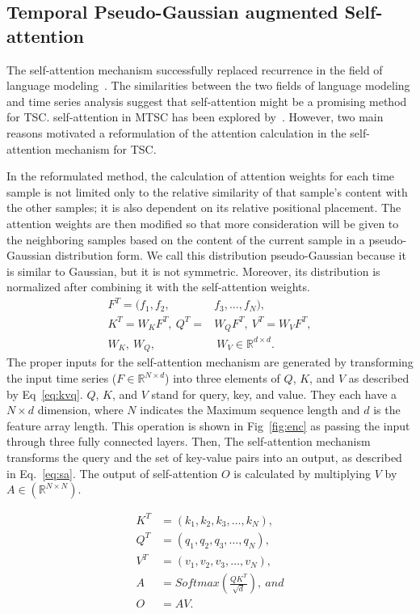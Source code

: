 \documentclass[journal]{IEEEtran}
\begin{document}
\subsection{Temporal Pseudo-Gaussian augmented Self-attention}
The self-attention mechanism successfully replaced recurrence in the field of language modeling~\cite{vaswani2017attention}. The similarities between the two fields of language modeling and time series analysis suggest that self-attention might be a promising method for TSC. self-attention in MTSC has been explored by~\cite{liu2021gated, zerveas2020transformer}. However, two main reasons motivated a reformulation of the attention calculation in the self-attention mechanism for TSC. 

In the reformulated method, the calculation of attention weights for each time sample is not limited only to the relative similarity of that sample's content with the other samples; it is also dependent on its relative positional placement. The attention weights are then modified so that more consideration will be given to the neighboring samples based on the content of the current sample in a pseudo-Gaussian distribution form. We call this distribution pseudo-Gaussian because it is similar to Gaussian, but it is not symmetric. Moreover, its distribution is normalized after combining it with the self-attention weights.
\begin{equation} \label{eq:kvq}
\begin{split}
F^T =(f_1,f_2,& f_3,\ldots,f_N ),\\
K^T= W_K F^T,\: Q^T=& W_Q F^T,\: V^T= W_V F^T,\\
W_K,\ W_Q,&\ W_V \in \mathbb{R}^{d \times d}.
\end{split}
\end{equation}
The proper inputs for the self-attention mechanism are generated by transforming the input time series ($F\in \mathbb{R}^{N \times d}$) into three elements of $Q$, $K$, and $V$ as described by Eq~\eqref{eq:kvq}. $Q$, $K$, and $V$ stand for query, key, and value. They each have a $N\times d$ dimension, where $N$ indicates the Maximum sequence length and $d$ is the feature array length. This operation is shown in Fig~\ref{fig:enc} as passing the input through three fully connected layers. Then, The self-attention mechanism transforms the query and the set of key-value pairs into an output, as described in Eq.~\eqref{eq:sa}. The output of self-attention $O$ is calculated by multiplying $V$ by $A \in (\mathbb{R}^{N \times N})$.


\begin{equation} \label{eq:sa}
\begin{split}
K^T &=\left(k_1,k_2,k_3,\ldots,k_N\right),\\
Q^T &=\left(q_1,q_2,q_3,\ldots,q_N\right),\\
V^T &=\left(v_1,v_2,v_3,\ldots,v_N\right),\\
A &=Softmax\left(\frac{QK^T}{\sqrt d}\right),\: and\\
O&=AV.
\end{split}
\end{equation}
\end{document}
